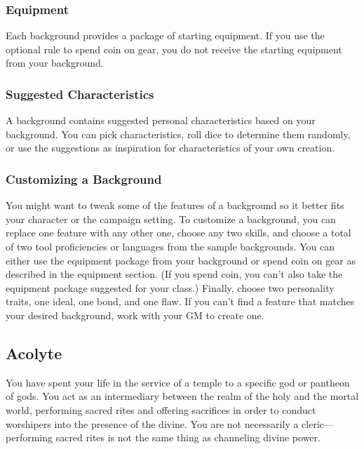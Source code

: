 \documentclass[
]{article}
\begin{document}
\hypertarget{equipment}{%
\subsubsection{Equipment}\label{equipment}}

Each background provides a package of starting equipment. If you use the
optional rule to spend coin on gear, you do not receive the starting
equipment from your background.

\hypertarget{suggested-characteristics}{%
\subsubsection{Suggested
Characteristics}\label{suggested-characteristics}}

A background contains suggested personal characteristics based on your
background. You can pick characteristics, roll dice to determine them
randomly, or use the suggestions as inspiration for characteristics of
your own creation.

\hypertarget{customizing-a-background}{%
\subsubsection{Customizing a
Background}\label{customizing-a-background}}

You might want to tweak some of the features of a background so it
better fits your character or the campaign setting. To customize a
background, you can replace one feature with any other one, choose any
two skills, and choose a total of two tool proficiencies or languages
from the sample backgrounds. You can either use the equipment package
from your background or spend coin on gear as described in the equipment
section. (If you spend coin, you can't also take the equipment package
suggested for your class.) Finally, choose two personality traits, one
ideal, one bond, and one flaw. If you can't find a feature that matches
your desired background, work with your GM to create one.

\hypertarget{acolyte}{%
\subsection{Acolyte}\label{acolyte}}

You have spent your life in the service of a temple to a specific god or
pantheon of gods. You act as an intermediary between the realm of the
holy and the mortal world, performing sacred rites and offering
sacrifices in order to conduct worshipers into the presence of the
divine. You are not necessarily a cleric---performing sacred rites is
not the same thing as channeling divine power.
\end{document}
